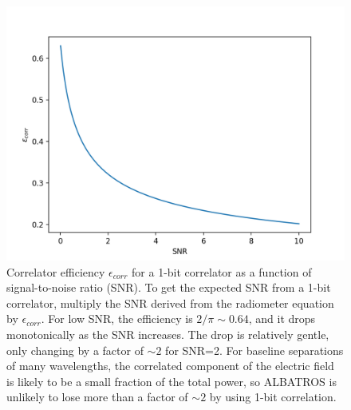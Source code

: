 \documentclass{ws-jai}
\begin{document}
\begin{figure}
  \begin{center}
    \includegraphics[width=0.7\linewidth]{Figures/corr_efficiency.png}
    \caption{Correlator efficiency $\epsilon_{corr}$ for a 1-bit correlator as a function of signal-to-noise ratio (SNR).  To get the expected SNR from a 1-bit correlator, multiply the SNR derived from the radiometer equation by $\epsilon_{corr}$.  For low SNR, the efficiency is $2/\pi \sim 0.64$, and it drops monotonically as the SNR increases.  The drop is relatively gentle, only changing by a factor of $\sim 2$ for SNR=2.  For baseline separations of many wavelengths, the correlated component of the electric field is likely to be a small fraction of the total power, so ALBATROS is unlikely to lose more than a factor of $\sim 2$ by using 1-bit correlation.}
    \label{Fig:1bit_efficiency}
    \end{center}
\end{figure}
\end{document}
